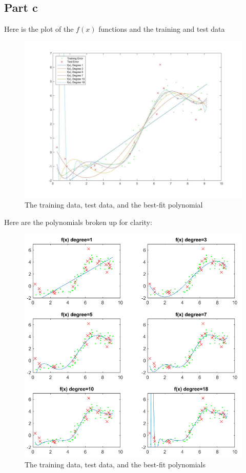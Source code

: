 \documentclass[twoside,11pt]{article}
\theoremstyle{definition}
\begin{document}
\newpage

\subsection*{Part c}


Here is the plot of the $f(x)$ functions and the training and test data
\begin{figure}[h]
\centering
\includegraphics[width=5 in]{prob1cPlotA.jpg}
\caption{The training data, test data, and the best-fit polynomial}
\end{figure}
\newpage
Here are the polynomials broken up for clarity:
\begin{figure}[h]
\centering
\includegraphics[width=6 in]{prob1cPlotAalt.png}
\caption{The training data, test data, and the best-fit polynomials}
\end{figure}
\end{document}
